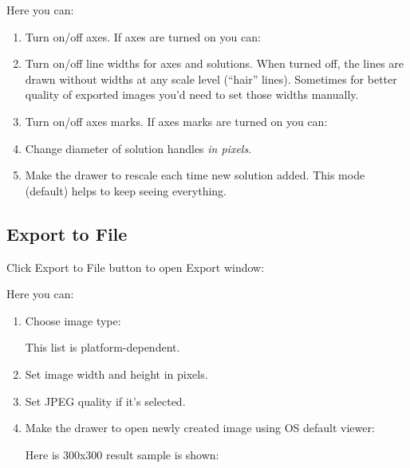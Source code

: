 \documentclass[12pt]{article}
\begin{document}
Here you can:
\begin{enumerate}
\item Turn on/off axes. If axes are turned on you can:

\item Turn on/off line widths for axes and solutions. When turned off, the lines are drawn 
without widths at any scale level (``hair'' lines). Sometimes for better 
quality of exported images you'd need to
set those widths manually. 

\item Turn on/off axes marks. If axes marks are turned on you can:

\item Change diameter of solution handles \textit{in pixels}.

\item Make the drawer to rescale each time new solution added. This mode (default) helps 
to keep seeing everything.
\end{enumerate}


\subsection{Export to File}


Click Export to File button  to open Export window:


Here you can:
\begin{enumerate}
\item Choose image type:


This list is platform-dependent.
\item Set image width and height in pixels.
\item Set JPEG quality if it's selected.
\item Make the drawer to open newly created image using OS default viewer:


Here is 300x300 result sample is shown:


\end{enumerate}
\end{document}
